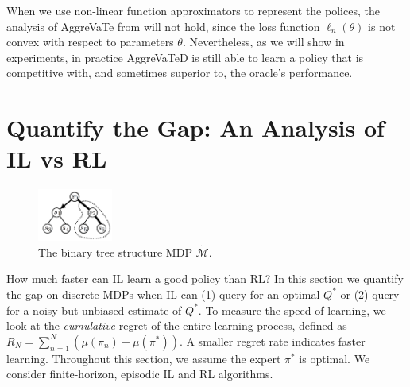 \documentclass{article}
\begin{document}
When we use non-linear function approximators to represent the polices, the analysis of AggreVaTe from \cite{ross2014reinforcement} will not hold, since the loss function $\ell_n(\theta)$ is not convex with respect to parameters $\theta$. Nevertheless, as we will show in experiments, in practice AggreVaTeD is still able to learn a policy that is competitive with, and sometimes superior to, the oracle's performance.  




\section{Quantify the Gap: An Analysis of IL vs RL}
\begin{figure}
  \centering
      \includegraphics[trim={1cm 0.5cm 0 1cm},clip, width=0.22\textwidth]{./figure/binary_tree_MDP}
  \caption{The binary tree structure MDP $\tilde{\mathcal{M}}$. %
  }
  \label{fig:binary_MDP}
  \vspace{-5pt}
\end{figure}
How much faster can IL learn a good policy than RL? In this section we quantify the gap on discrete MDPs when IL can (1) query for an {optimal} $Q^*$ or (2) query for a noisy but unbiased estimate of $Q^*$. To measure the speed of learning, we look at the \emph{cumulative} regret of the entire learning process, defined as $R_N = \sum_{n=1}^N (\mu(\pi_n) - \mu(\pi^*))$. A smaller regret rate indicates faster learning. Throughout this section, we assume the expert $\pi^*$ is optimal. We consider finite-horizon, episodic IL and RL algorithms. 
\end{document}
